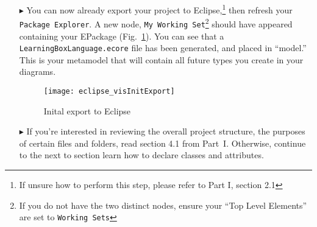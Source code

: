 \begin{itemize}
\item[$\blacktriangleright$] You can now already export your project to Eclipse,\footnote{If unsure how to perform this step, please refer to Part I, section
2.1} then refresh your \texttt{Package Explorer}. A new node, \texttt{My Working Set}\footnote{If you do not have the two distinct nodes, ensure your ``Top
Level Elements'' are set to \texttt{Working Sets}} should have appeared containing your EPackage (Fig.~\ref{fig:init_export}). You can see that a
\texttt{LearningBoxLanguage.ecore} file has been generated, and placed in ``model.'' This is your metamodel that will contain all future types you create in
your diagrams.

\clearpage

\vspace*{2cm}

\begin{figure}[htbp]
	\centering
  \texttt{[image: eclipse\_visInitExport]}
	\caption{Inital export to Eclipse}
	\label{fig:init_export}
\end{figure}

\vspace{1cm}

\item[$\blacktriangleright$] If you're interested in reviewing the overall project structure, the purposes of certain files and folders, read section 4.1 from
Part~I. Otherwise, continue to the next to section learn how to declare classes and attributes.

\end{itemize}
